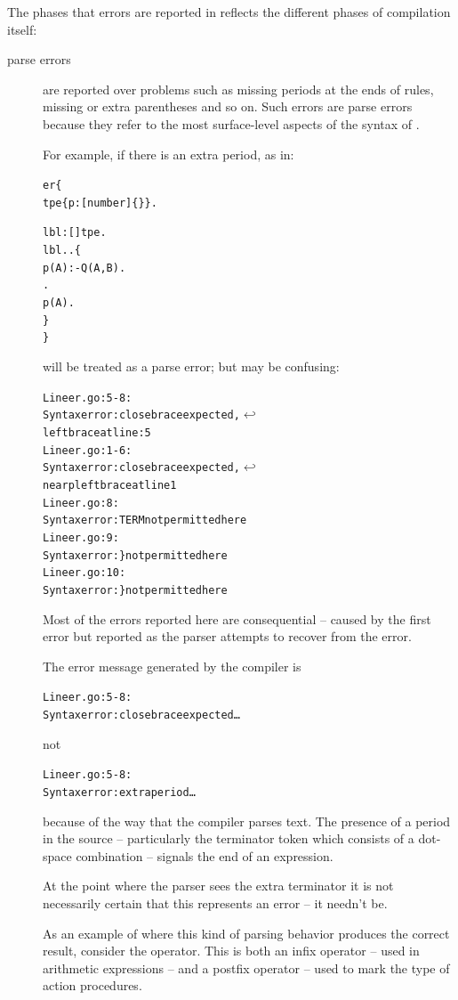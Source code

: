 The phases that errors are reported in reflects the different phases of compilation itself:
\begin{description}
\item[parse errors] are reported over problems such as missing periods at the ends of rules, missing or extra parentheses and so on. Such errors are parse errors because they refer to the most surface-level aspects of the syntax of \go.

For example, if there is an extra period, as in:
\begin{alltt}
er\{
  tpe \impl{} \{p:[number]\{\}\}.

  lbl:[]\conarrow{}tpe.
  lbl..\{
    p(A) :- Q(A,B).
    .
    p(A).
  \}
\}
\end{alltt}
will be treated as a parse error; but may be confusing:
\begin{alltt}
Line er.go:5-8:
Syntax error: close brace expected,\ensuremath{\hookleftarrow{}}
     left brace at line: 5
Line er.go:1-6:
Syntax error: close brace expected,\ensuremath{\hookleftarrow{}}
     near p left brace at line 1
Line er.go:8:
Syntax error: TERM not permitted here
Line er.go:9:
Syntax error: \} not permitted here
Line er.go:10:
Syntax error: \} not permitted here
\end{alltt}
Most of the errors reported here are consequential -- caused by the first error but reported as the parser attempts to recover from the error.

The error message generated by the compiler is
\begin{alltt}
Line er.go:5-8:
Syntax error: close brace expected \ldots
\end{alltt}
not
\begin{alltt}
Line er.go:5-8:
Syntax error: extra period \ldots
\end{alltt}
because of the way that the compiler parses text. The presence of a period in the source -- particularly the terminator token which consists of a dot-space combination -- signals the end of an expression.

At the point where the parser sees the extra terminator it is not necessarily certain that this represents an error -- it needn't be.

\begin{aside}
As an example of where this kind of parsing behavior produces the correct result, consider the \q{*} operator. This is both an infix operator -- used in arithmetic expressions -- and a postfix operator -- used to mark the type of action procedures.


\end{aside}
\end{description}
